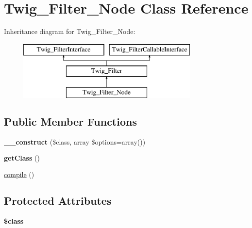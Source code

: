 \hypertarget{classTwig__Filter__Node}{}\section{Twig\+\_\+\+Filter\+\_\+\+Node Class Reference}
\label{classTwig__Filter__Node}
Inheritance diagram for Twig\+\_\+\+Filter\+\_\+\+Node\+:\begin{figure}[H]
\begin{center}
\leavevmode
\includegraphics[height=3.000000cm]{classTwig__Filter__Node}
\end{center}
\end{figure}
\subsection*{Public Member Functions}
\begin{DoxyCompactItemize}
\item 
{\bfseries \+\_\+\+\_\+construct} (\$class, array \$options=array())\hypertarget{classTwig__Filter__Node_aa11baf86ee86d680c1688c19ed202a4f}{}\label{classTwig__Filter__Node_aa11baf86ee86d680c1688c19ed202a4f}

\item 
{\bfseries get\+Class} ()\hypertarget{classTwig__Filter__Node_aa77d7de219b734087f6d3a8bb66cb7b7}{}\label{classTwig__Filter__Node_aa77d7de219b734087f6d3a8bb66cb7b7}

\item 
\hyperlink{classTwig__Filter__Node_a13392ee6c24fa5840c634a3827aded56}{compile} ()
\end{DoxyCompactItemize}
\subsection*{Protected Attributes}
\begin{DoxyCompactItemize}
\item 
{\bfseries \$class}\hypertarget{classTwig__Filter__Node_ad743e5937f9e30d8895e6918faed5cfe}{}\label{classTwig__Filter__Node_ad743e5937f9e30d8895e6918faed5cfe}

\end{DoxyCompactItemize}


